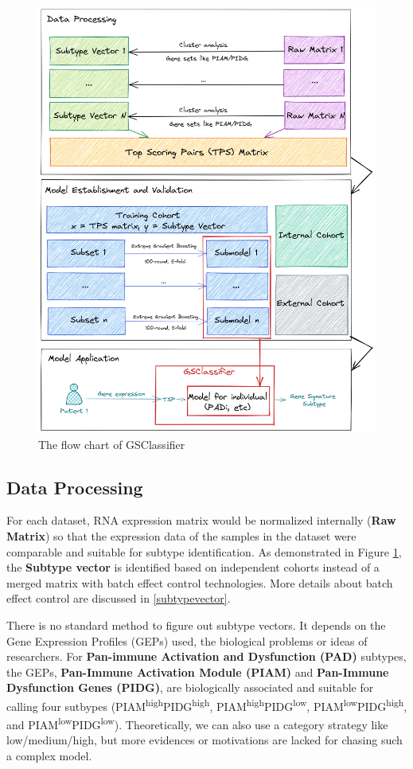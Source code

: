 \documentclass[
  12pt,
]{book}
\begin{document}
\begin{figure}

{\centering \includegraphics[width=0.9\linewidth]{./fig/flowchart} 

}

\caption{The flow chart of GSClassifier}\label{fig:flowchart}
\end{figure}

\hypertarget{data-processing}{%
\subsection{Data Processing}\label{data-processing}}

For each dataset, RNA expression matrix would be normalized internally (\textbf{Raw Matrix}) so that the expression data of the samples in the dataset were comparable and suitable for subtype identification. As demonstrated in Figure \ref{fig:flowchart}, the \textbf{Subtype vector} is identified based on independent cohorts instead of a merged matrix with batch effect control technologies. More details about batch effect control are discussed in \ref{subtypevector}.

There is no standard method to figure out subtype vectors. It depends on the Gene Expression Profiles (GEPs) used, the biological problems or ideas of researchers. For \textbf{Pan-immune Activation and Dysfunction (PAD)} subtypes, the GEPs, \textbf{Pan-Immune Activation Module (PIAM)} and \textbf{Pan-Immune Dysfunction Genes (PIDG)}, are biologically associated and suitable for calling four sutbypes (PIAM\textsuperscript{high}PIDG\textsuperscript{high}, PIAM\textsuperscript{high}PIDG\textsuperscript{low}, PIAM\textsuperscript{low}PIDG\textsuperscript{high}, and PIAM\textsuperscript{low}PIDG\textsuperscript{low}). Theoretically, we can also use a category strategy like low/medium/high, but more evidences or motivations are lacked for chasing such a complex model.
\end{document}
